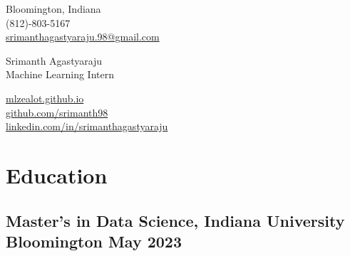 \documentclass[a4,10pt]{article}
\begin{document}
\begin{center}
    \begin{minipage}[b]{0.24\textwidth}
            \small Bloomington, Indiana \\
            \small (812)-803-5167 \\
            \small \href{mailto:srimanthagastyaraju.98@gmail.com}{srimanthagastyaraju.98@gmail.com}
    \end{minipage}%
    \begin{minipage}[b]{0.5\textwidth}
            \centering
            {\HUGE Srimanth Agastyaraju} \\ %
            \vspace{0.1cm}
            {\color{UI_blue} \Large{Machine Learning Intern}} \\
    \end{minipage}%
    \begin{minipage}[b]{0.24\textwidth}
            \flushright \small  %
            {\href{https://mlzealot.github.io/}{mlzealot.github.io}} \\
            {\href{https://github.com/srimanth98}{github.com/srimanth98}} \\
            \href{https://www.linkedin.com/in/srimanthagastyaraju/}{linkedin.com/in/srimanthagastyaraju}
    \end{minipage}   
    
\vspace{-0.15cm} 
{\color{UI_blue} \hrulefill}
\end{center}
\vspace{-0.2cm}

\vspace{-0.2cm}



\section{Education }
\subsection*{Master’s in Data Science, {\normalsize \normalfont Indiana University Bloomington} \hfill May 2023} 
\vspace{0.1cm}
\end{document}
